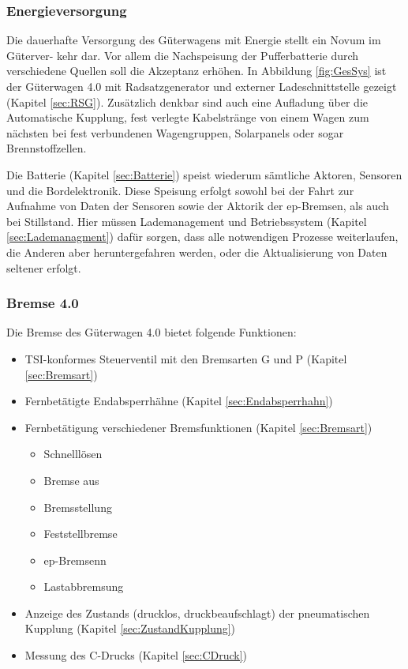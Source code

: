 \subsubsection{Energieversorgung}
Die dauerhafte Versorgung des Güterwagens mit Energie stellt ein Novum im Güterver- kehr dar. Vor allem die Nachspeisung der Pufferbatterie durch verschiedene Quellen soll die Akzeptanz erhöhen. In Abbildung \ref{fig:GesSys} ist der Güterwagen 4.0 mit Radsatzgenerator und externer Ladeschnittstelle gezeigt (Kapitel \ref{sec:RSG}). Zusätzlich denkbar sind auch eine Aufladung über die Automatische Kupplung, fest verlegte Kabelstränge von einem Wagen zum nächsten bei fest verbundenen Wagengruppen, Solarpanels oder sogar Brennstoffzellen. %
\par
Die Batterie (Kapitel \ref{sec:Batterie}) speist wiederum sämtliche Aktoren, Sensoren und die Bordelektronik. Diese Speisung erfolgt sowohl bei der Fahrt zur Aufnahme von Daten der Sensoren sowie der Aktorik der \gls{ep-Bremsen}, als auch bei Stillstand. Hier müssen Lademanagement und Betriebssystem (Kapitel \ref{sec:Lademanagment}) dafür sorgen, dass alle notwendigen Prozesse weiterlaufen, die Anderen aber heruntergefahren werden, oder die Aktualisierung von Daten seltener erfolgt.


\subsubsection{Bremse 4.0}
Die Bremse des Güterwagen 4.0 bietet folgende Funktionen:
\begin{itemize}
    \item TSI-konformes Steuerventil mit den \gls{Bremsart}en G und P (Kapitel \ref{sec:Bremsart})
    \item Fernbetätigte Endabsperrhähne (Kapitel \ref{sec:Endabsperrhahn})
    \item Fernbetätigung verschiedener Bremsfunktionen  (Kapitel \ref{sec:Bremsart})
    \begin{itemize}
        \item Schnelllösen
        \item Bremse aus
        \item Bremsstellung
        \item Feststellbremse
        \item \gls{ep-Bremsen}n
        \item Lastabbremsung
    \end{itemize}
    \item Anzeige des Zustands (drucklos, druckbeaufschlagt) der pneumatischen Kupplung (Kapitel \ref{sec:ZustandKupplung})
    \item Messung des C-Drucks (Kapitel \ref{sec:CDruck})
\end{itemize}

